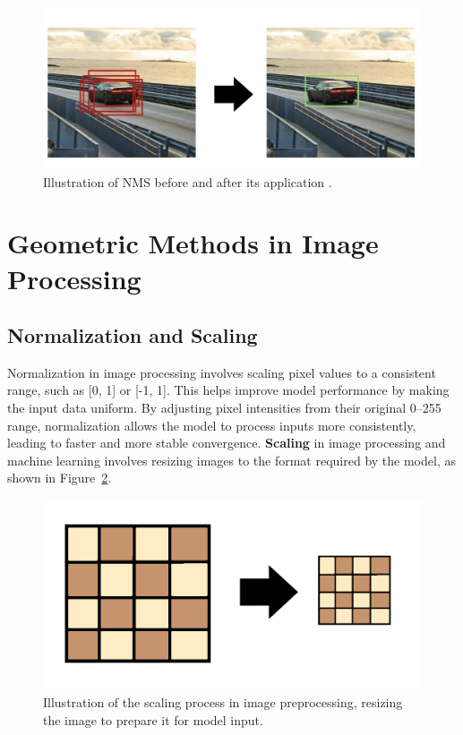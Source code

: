 \begin{figure}[h!]
    \centering
    \includegraphics[width=0.75\linewidth]{figures/theory/image-recognition/nms.png}
    \caption[NMS before and after]{Illustration of NMS before and after its application \cite{thepythoncode:nms}.}
    \label{fig:nms}
\end{figure}

\section{Geometric Methods in Image Processing}
\label{sec:geometric-methods}


\subsection*{Normalization and Scaling}
\label{subsec:normalization-and-scaling}

Normalization in image processing involves scaling pixel values to a consistent range, such as [0, 1] or [-1, 1]. This helps improve model performance by making the input data uniform. By adjusting pixel intensities from their original 0–255 range, normalization allows the model to process inputs more consistently, leading to faster and more stable convergence.
\textbf{Scaling} in image processing and machine learning involves resizing images to the format required by the model, as shown in Figure~\ref{fig:nms}. 

\begin{figure}[h!]
    \centering
    \includegraphics[width=0.75\linewidth]{figures/theory/image-recognition/scaling.png}
    \caption[Scaling before and after]{Illustration of the scaling process in image preprocessing, resizing the image to prepare it for model input.}
    \label{fig:nms}
\end{figure}



